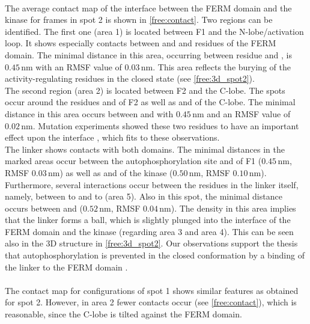%
%
%
\\
The average contact map of the interface between the FERM domain and the kinase for frames in spot 2 is shown in \autoref{free:contact}. Two regions can be identified. The first one (area 1) is located between F1 and the N-lobe/activation loop. It shows especially contacts between  and  and residues of the FERM domain. The minimal distance in this area, occurring between residue  and , is $0.45\,\si{\nano\metre}$ with an RMSF value of $0.03\,\si{\nano\metre}$. This area reflects the burying of the activity-regulating residues in the closed state (see \autoref{free:3d_spot2}).\\
The second region (area 2) is located between F2 and the C-lobe. The spots occur around the residues  and  of F2 as well as  and  of the C-lobe. The minimal distance in this area occurs between  and  with $0.45\,\si{\nano\metre}$ and an RMSF value of $0.02\,\si{\nano\metre}$. Mutation experiments showed these two residues to have an important effect upon the interface \autocite{structFAK}, which fits to these observations.\\
The linker shows contacts with both domains. The minimal distances in the marked areas occur between the autophosphorylation site  and  of F1 ($0.45\,\si{\nano\metre}$, RMSF $0.03\,\si{\nano\metre}$) as well as  and  of the kinase ($0.50\,\si{\nano\metre}$, RMSF $0.10\,\si{\nano\metre}$). Furthermore, several interactions occur between the residues in the linker itself, namely, between  to  and  to  (area 5). Also in this spot, the minimal distance occurs between  and  ($0.52\,\si{\nano\metre}$, RMSF $0.04\,\si{\nano\metre}$). The density in this area implies that the linker forms a ball, which is slightly plunged into the interface of the FERM domain and the kinase (regarding area 3 and area 4). This can be seen also in the 3D structure in \autoref{free:3d_spot2}. Our observations support the thesis that autophosphorylation is prevented in the closed conformation by a binding of the linker to the FERM domain \autocite{pap003}.\\
\\
The contact map for configurations of spot 1 shows similar features as obtained for spot 2. However, in area 2 fewer contacts occur (see \autoref{free:contact}), which is reasonable, since the C-lobe is tilted against the FERM domain. %
